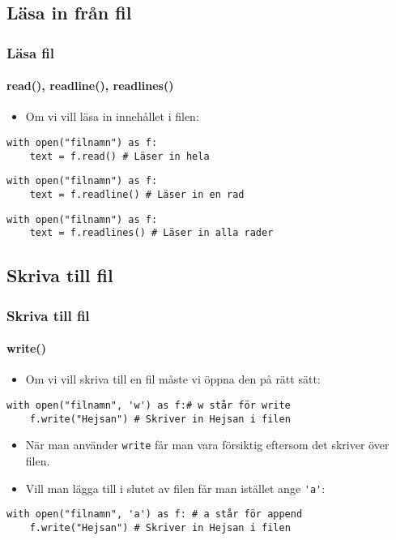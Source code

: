 \documentclass[aspectratio=169]{beamer}
\newcommand{\code}[1]{\colorbox{white}{\lstinline{#1}}}
\begin{document}
	\subsection{Läsa in från fil}
	
	\begin{frame}[fragile]
		\frametitle{Läsa fil}
		\framesubtitle{read(), readline(), readlines()}
		
		\begin{itemize}
			\item Om vi vill läsa in innehållet i filen:
		\end{itemize}
		
		\begin{lstlisting}
with open("filnamn") as f:
	text = f.read() # Läser in hela
		\end{lstlisting}
		
		\begin{lstlisting}
with open("filnamn") as f:
	text = f.readline() # Läser in en rad
		\end{lstlisting}
		
		\begin{lstlisting}
with open("filnamn") as f:
	text = f.readlines() # Läser in alla rader
		\end{lstlisting}
		
	\end{frame}

	\subsection{Skriva till fil}
	
	\begin{frame}[fragile]
		\frametitle{Skriva till fil}
		\framesubtitle{write()}
		
		\begin{itemize}
			\item Om vi vill skriva till en fil måste vi öppna den på rätt sätt:
		\end{itemize}
		
		\begin{lstlisting}
with open("filnamn", 'w') as f:# w står för write
	f.write("Hejsan") # Skriver in Hejsan i filen
		\end{lstlisting}
		
		\begin{itemize}
			\item När man använder \code{write} får man vara försiktig eftersom det skriver över filen.
			\item Vill man lägga till i slutet av filen får man istället ange \code{'a'}:
		\end{itemize}
		
		\begin{lstlisting}
with open("filnamn", 'a') as f: # a står för append
	f.write("Hejsan") # Skriver in Hejsan i filen
		\end{lstlisting}
	
	\end{frame}
	
\end{document}
